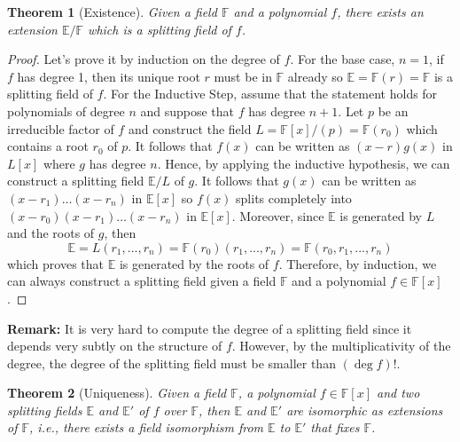 \documentclass{article}
\newtheorem*{theorem}{Theorem}
\newcommand{\F}{\mathbb{F}}
\newcommand{\E}{\mathbb{E}}
\newenvironment{remark}{\noindent\textbf{Remark:}}{}
\begin{document}
\begin{theorem}[Existence]
    Given a field $\F$ and a polynomial $f$, there exists an extension $\E / \F$ which is a splitting field of $f$.
\end{theorem}

\begin{proof}
    Let's prove it by induction on the degree of $f$. For the base case, $n=1$, if $f$ has degree 1, then its unique root $r$ must be in $\F$ already so $\E = \F(r) = \F$ is a splitting field of $f$. For the Inductive Step, assume that the statement holds for polynomials of degree $n$ and suppose that $f$ has degree $n+1$. Let $p$ be an irreducible factor of $f$ and construct the field $L = \F[x]/(p) = \F(r_0)$ which contains a root $r_0$ of $p$. It follows that $f(x)$ can be written as $(x - r)g(x)$ in $L[x]$ where $g$ has degree $n$. Hence, by applying the inductive hypothesis, we can construct a splitting field $\E / L$ of $g$. It follows that $g(x)$ can be written as $(x - r_1) \dots (x - r_n)$ in $\E[x]$ so $f(x)$ splits completely into $(x - r_0)(x - r_1) \dots (x - r_n)$ in $\E[x]$. Moreover, since $\E$ is generated by $L$ and the roots of $g$, then
    $$\E = L(r_1, ..., r_n) = \F(r_0)(r_1, ..., r_n) = \F(r_0, r_1, ..., r_n)$$
    which proves that $\E$ is generated by the roots of $f$. Therefore, by induction, we can always construct a splitting field given a field $\F$ and a polynomial $f \in \F[x]$.
\end{proof}

\begin{remark}
    It is very hard to compute the degree of a splitting field since it depends very subtly on the structure of $f$. However, by the multiplicativity of the degree, the degree of the splitting field must be smaller than $(\deg f)!$.
\end{remark}

\begin{theorem}[Uniqueness]
    Given a field $\F$, a polynomial $f \in \F[x]$ and two splitting fields $\E$ and $\E'$ of $f$ over $\F$, then $\E$ and $\E'$ are isomorphic as extensions of $\F$, i.e., there exists a field isomorphism from $\E$ to $\E'$ that fixes $\F$.
\end{theorem}
\end{document}
